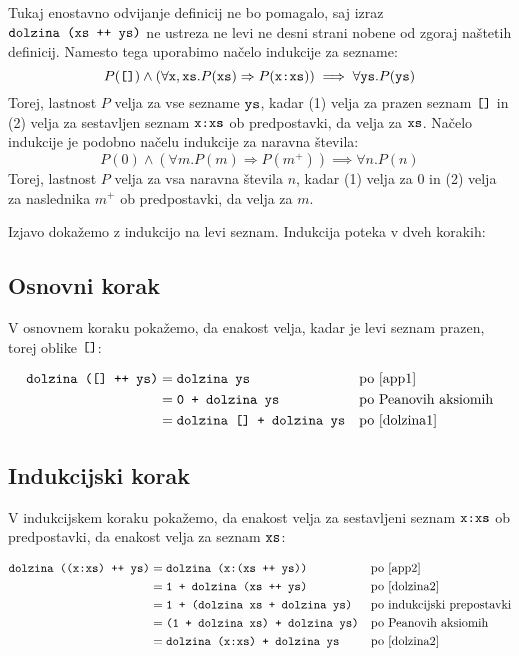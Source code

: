 \documentclass[11pt,a4paper]{article}
\begin{document}
Tukaj enostavno odvijanje definicij ne bo pomagalo, saj izraz $\mbox{\texttt{dolzina (xs ++ ys)}}$ ne ustreza ne levi ne desni strani nobene od zgoraj naštetih definicij.
Namesto tega uporabimo načelo indukcije za sezname:
\[
  P(\mbox{\texttt{[]}}) \land (\forall \mbox{\texttt{x}}, \mbox{\texttt{xs}}. P(\mbox{\texttt{xs}}) \Rightarrow P(\mbox{\texttt{x:xs}})) \implies \forall \mbox{\texttt{ys}}. P(\mbox{\texttt{ys}})
\]
Torej, lastnost $P$ velja za vse sezname $\mbox{\texttt{ys}}$, kadar (1) velja za prazen seznam $\mbox{\texttt{[]}}$ in (2) velja za sestavljen seznam $\mbox{\texttt{x:xs}}$ ob predpostavki, da velja za $\mbox{\texttt{xs}}$.
Načelo indukcije je podobno načelu indukcije za naravna števila:
\[
  P(0) \land (\forall m. P(m) \Rightarrow P(m^{+})) \implies \forall n. P(n)
\]
Torej, lastnost $P$ velja za vsa naravna števila $n$, kadar (1) velja za $0$ in (2) velja za naslednika $m^{+}$ ob predpostavki, da velja za $m$.

Izjavo dokažemo z indukcijo na levi seznam. Indukcija poteka v dveh korakih:

\subsection*{Osnovni korak}

V osnovnem koraku pokažemo, da enakost velja, kadar je levi seznam prazen, torej oblike $\mbox{\texttt{[]}}$:

\begin{align*}
  \mbox{\texttt{dolzina ([] ++ ys)}}
  &= \mbox{\texttt{dolzina ys}}
    &&\text{po \eqref{app1}} \\
  &= \mbox{\texttt{0 + dolzina ys}}
    &&\text{po Peanovih aksiomih} \\
  &= \mbox{\texttt{dolzina [] + dolzina ys}}
    &&\text{po \eqref{dolzina1}}
\end{align*}

\subsection*{Indukcijski korak}

V indukcijskem koraku pokažemo, da enakost velja za sestavljeni seznam $\mbox{\texttt{x:xs}}$ ob predpostavki, da enakost velja za seznam $\mbox{\texttt{xs}}$:

\begin{align*}
  \mbox{\texttt{dolzina ((x:xs) ++ ys)}}
  &= \mbox{\texttt{dolzina (x:(xs ++ ys))}}
    &&\text{po \eqref{app2}} \\
  &= \mbox{\texttt{1 + dolzina (xs ++ ys)}}
    &&\text{po \eqref{dolzina2}} \\
  &= \mbox{\texttt{1 + (dolzina xs + dolzina ys)}}
    &&\text{po indukcijski prepostavki} \\
  &= \mbox{\texttt{(1 + dolzina xs) + dolzina ys)}}
    &&\text{po Peanovih aksiomih} \\
  &= \mbox{\texttt{dolzina (x:xs) + dolzina ys}}
    &&\text{po \eqref{dolzina2}}
\end{align*}
\end{document}
